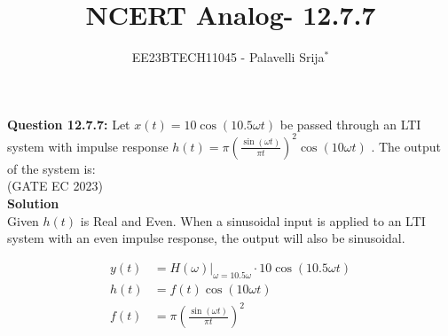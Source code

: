\documentclass[journal,12pt,twocolumn]{IEEEtran}
\theoremstyle{remark}
\begin{document}

\vspace{3cm}

\title{NCERT Analog- 12.7.7}
\author{EE23BTECH11045 - Palavelli Srija$^{*}$}

\maketitle

\bigskip

\renewcommand{\thefigure}{\theenumi}
\renewcommand{\thetable}{\theenumi}

\vspace{3cm}
\textbf{Question 12.7.7:} 
Let $x(t) = 10 \cos(10.5 \omega t)$ be passed through an LTI system with impulse response $h(t) = \pi\left(\frac{\sin(\omega t)}{\pi t}\right)^2 \cos(10 \omega t)$ . The output of the system is:\\ \hfill(GATE EC 2023)\\
\textbf{Solution}\\
Given \(h(t)\) is Real and Even. When a sinusoidal input is applied to an LTI system with an even impulse response, the output will also be sinusoidal.
\begin{align}
y(t) &= H(\omega)\bigg|_{\omega=10.5\omega} \cdot 10 \cos(10.5 \omega t) \\
h(t) &= f(t) \cos(10 \omega t) \\
f(t) &= \pi\left(\frac{\sin(\omega t)}{\pi t}\right)^2 \\
\end{align}
\end{document}
